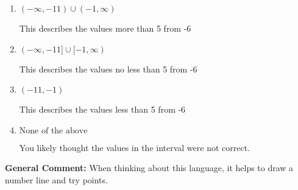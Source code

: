 \documentclass{extbook}[14pt]
\begin{document}
\begin{enumerate}
{\begin{enumerate}[label=\Alph*.]
This describes the values no more than 5 from -6
\item \( (-\infty, -11) \cup (-1, \infty) \)

This describes the values more than 5 from -6
\item \( (-\infty, -11] \cup [-1, \infty) \)

This describes the values no less than 5 from -6
\item \( (-11, -1) \)

This describes the values less than 5 from -6
\item \( \text{None of the above} \)

You likely thought the values in the interval were not correct.
\end{enumerate}

\textbf{General Comment:} When thinking about this language, it helps to draw a number line and try points.
}
\end{enumerate}
\end{document}
